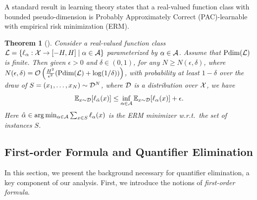\documentclass{article}
\theoremstyle{plain}
\newtheorem{theorem}{Theorem}[section]
\theoremstyle{definition}
\theoremstyle{remark}
\begin{document}
A standard result in learning theory states that a real-valued function class with bounded pseudo-dimension is Probably Approximately Correct (PAC)-learnable with empirical risk minimization (ERM). 

\begin{theorem}[\citealp{pollard1984convergence}] \label{thm:pdim-to-generalization}
    Consider a real-valued function class $\mathcal{L} = \{\ell_{\alpha}: \mathcal{X} \rightarrow [-H, H] \mid \alpha \in \mathcal{A}\}$ parameterized by $\alpha \in \mathcal{A}$. Assume that $\text{\normalfont Pdim}(\mathcal{L})$ is finite. Then given $\epsilon > 0$ and $\delta \in (0, 1)$, for any $N \geq N(\epsilon, \delta)$, where $N(\epsilon, \delta) = \mathcal{O}\left(\frac{H^2}{\epsilon^2}(\text{\normalfont Pdim}(\mathcal{L}) + \log(1/\delta))\right)$, with probability at least $1 - \delta$ over the draw of $S = (x_1, \dots, x_N) \sim \mathcal{D}^N$, where $\mathcal{D}$ is a distribution over $\mathcal{X}$, we have 
    $$
        \mathbb{E}_{x \sim \mathcal{D}}[\ell_{\hat{\alpha}}(x)] \leq \inf_{\alpha \in \mathcal{A}} \mathbb{E}_{x \sim \mathcal{D}}[\ell_{\alpha}(x)] + \epsilon.
    $$
    Here $\hat{\alpha} \in \arg \min_{\alpha \in \mathcal{A}} \sum_{x \in S} \ell_{\alpha}(x)$ is the ERM minimizer w.r.t.~the set of instances $S$.
\end{theorem}

\subsection{First-order Formula and Quantifier Elimination}

In this section, we present the background necessary for quantifier elimination, a key component of our analysis. First, we introduce the notions of \textit{first-order formula}.
\end{document}
